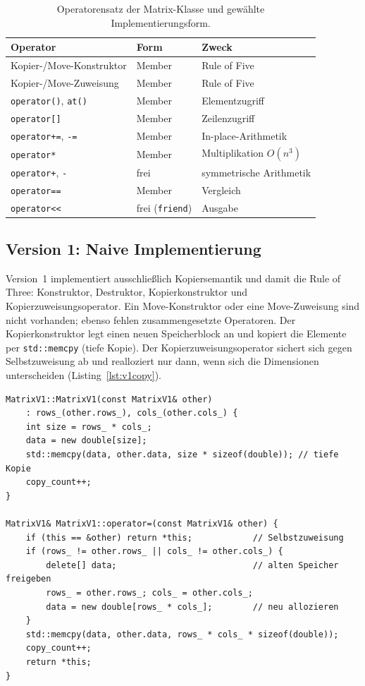 \documentclass[10pt,a4paper]{article}
\begin{document}
\begin{table}[htbp]
\centering
\caption{Operatorensatz der Matrix-Klasse und gewählte Implementierungsform.}
\label{tab:operatoren}
\begin{tabular}{lll}
\toprule
\textbf{Operator} & \textbf{Form} & \textbf{Zweck} \\
\midrule
Kopier-/Move-Konstruktor      & Member & Rule of Five \\
Kopier-/Move-Zuweisung        & Member & Rule of Five \\
\texttt{operator()}, \texttt{at()} & Member & Elementzugriff \\
\texttt{operator[]}           & Member & Zeilenzugriff \\
\texttt{operator+=}, \texttt{-=} & Member & In-place-Arithmetik \\
\texttt{operator*}            & Member & Multiplikation $O(n^3)$ \\
\texttt{operator+}, \texttt{-} & frei   & symmetrische Arithmetik \\
\texttt{operator==}           & Member & Vergleich \\
\texttt{operator<<}           & frei (\texttt{friend}) & Ausgabe \\
\bottomrule
\end{tabular}
\end{table}

\subsection{Version 1: Naive Implementierung}
\label{sec:v1}

Version~1 implementiert ausschließlich Kopiersemantik und damit die Rule of
Three: Konstruktor, Destruktor, Kopierkonstruktor und Kopierzuweisungsoperator.
Ein Move-Konstruktor oder eine Move-Zuweisung sind nicht vorhanden; ebenso
fehlen zusammengesetzte Operatoren. Der Kopierkonstruktor legt einen neuen
Speicherblock an und kopiert die Elemente per \texttt{std::memcpy} (tiefe
Kopie). Der Kopierzuweisungsoperator sichert sich gegen Selbstzuweisung ab und
realloziert nur dann, wenn sich die Dimensionen unterscheiden
(Listing~\ref{lst:v1copy}).

\begin{lstlisting}[caption={Tiefe Kopie in Version 1: Kopierkonstruktor und Kopierzuweisung}, label={lst:v1copy}]
MatrixV1::MatrixV1(const MatrixV1& other)
    : rows_(other.rows_), cols_(other.cols_) {
    int size = rows_ * cols_;
    data = new double[size];
    std::memcpy(data, other.data, size * sizeof(double)); // tiefe Kopie
    copy_count++;
}

MatrixV1& MatrixV1::operator=(const MatrixV1& other) {
    if (this == &other) return *this;            // Selbstzuweisung
    if (rows_ != other.rows_ || cols_ != other.cols_) {
        delete[] data;                           // alten Speicher freigeben
        rows_ = other.rows_; cols_ = other.cols_;
        data = new double[rows_ * cols_];        // neu allozieren
    }
    std::memcpy(data, other.data, rows_ * cols_ * sizeof(double));
    copy_count++;
    return *this;
}
\end{lstlisting}
\end{document}
